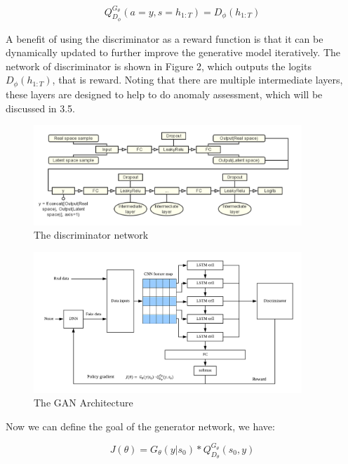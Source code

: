 \documentclass{acmtog} %
\begin{document}
\begin{equation}
Q_{D_\phi}^{G_\theta}(a = y, s = h_{1:T}) = D_\phi(h_{1:T})
\label{eq:samplevar}
\end{equation}

A benefit of using the discriminator as a reward function is that it can be dynamically updated to further improve the generative model iteratively. The network of discriminator is shown in Figure 2, which outputs the logits $D_{\phi}(h_{1:T})$, that is reward. Noting that there are multiple intermediate layers, these layers are designed to help to do anomaly assessment, which will be discussed in 3.5.

\begin{figure}
   \begin{center}
      \includegraphics[width=0.9\textwidth]{dis.png}
   \end{center}
\caption{The discriminator network}
\label{RTL}
\end{figure}

\begin{figure}
	\begin{center}
		\includegraphics[width=0.9\textwidth]{gan.png}
	\end{center}
	\caption{The GAN Architecture}
	\label{RTL}
\end{figure}

Now we can define the goal of the generator network, we have:

\begin{equation}
J(\theta) = G_\theta(y|s_0) * Q_{D_\theta}^{G_\theta}(s_0, y)
\label{eq:samplevar}
\end{equation}
\end{document}
